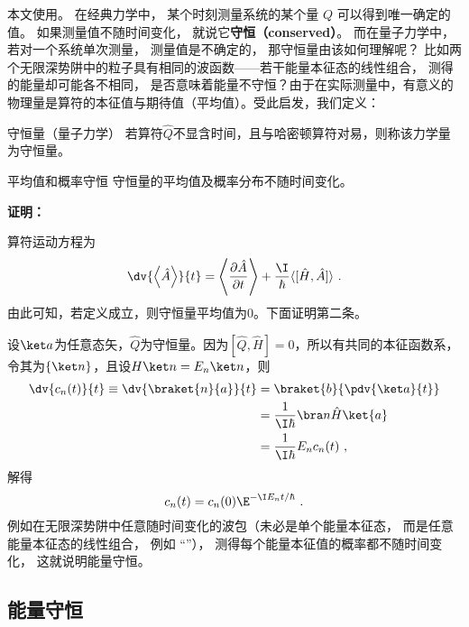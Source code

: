 
本文使用。 在经典力学中， 某个时刻测量系统的某个量 $Q$ 可以得到唯一确定的值。 如果测量值不随时间变化， 就说它\textbf{守恒（conserved）}。 而在量子力学中， 若对一个系统单次测量， 测量值是不确定的， 那守恒量由该如何理解呢？ 比如两个无限深势阱中的粒子具有相同的波函数——若干能量本征态的线性组合， 测得的能量却可能各不相同， 是否意味着能量不守恒？由于在实际测量中，有意义的物理量是算符的本征值与期待值（平均值）。受此启发，我们定义：
\begin{definition}{守恒量（量子力学）}\label{def_QMcons_1}
若算符$\hat Q$不显含时间，且与哈密顿算符对易，则称该力学量为守恒量。
\end{definition}
\begin{corollary}{平均值和概率守恒}
守恒量的平均值及概率分布不随时间变化。
\end{corollary}
\textbf{证明：}

算符运动方程为
\begin{equation}
\dv{\left\langle \hat A \right\rangle}{t}=\left\langle\frac{\partial \hat A}{\partial t}\right\rangle+\frac{\I}{\hbar}\langle[\hat H, \hat A]\rangle~.
\end{equation}
由此可知，若定义成立，则守恒量平均值为0。下面证明第二条。

设$\ket a$为任意态矢，$\hat Q$为守恒量。因为$[\hat Q,\hat H]=0$，所以有共同的本征函数系，令其为$\{\ket n\}$，且设$H\ket n=E_n\ket n$，则
\begin{equation}
\begin{aligned}
\dv{c_n(t)}{t}\equiv\dv{\braket{n}{a}}{t}&=\braket{b}{\pdv{\ket a}{t}}\\
&=\frac{1}{\I\hbar}\bra n \hat H\ket{a}\\
&=\frac{1}{\I\hbar}E_nc_n(t)~,
\end{aligned}
\end{equation}
解得
\begin{equation}
c_n(t)=c_n(0)\E^{-\I E_n t/\hbar }~.
\end{equation}
例如在无限深势阱中任意随时间变化的波包（未必是单个能量本征态， 而是任意能量本征态的线性组合， 例如 “”）， 测得每个能量本征值的概率都不随时间变化， 这就说明能量守恒。
\subsection{能量守恒}

